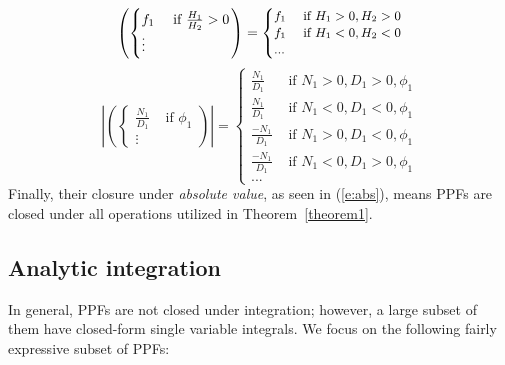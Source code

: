 \documentclass[letterpaper]{article}
\newcommand{\case}[2]{#2 &\text{ if } #1}%
\begin{document}
{\scriptsize
\vspace{3mm}
\begin{equation} 
\label{e:fractional2nlpa}
\left(
 \begin{cases}
  \case{\frac{H_1}{H_2} > 0}{f_1} \\
   \vdots
 \end{cases} 
\right)
 =
{\footnotesize
\begin{cases}
  \case{H_1 > 0, H_2 > 0 }{f_1} \\ 
  \case{H_1 < 0, H_2 < 0}{f_1} \\ 
  ...
 \end{cases} 
}
\end{equation}
\begin{equation}\label{e:abs}
\left|
\left(
  \begin{cases}
  \case{\phi_1}{\frac{N_1}{D_1}}\\
  \vdots
  \end{cases}
\right)
\right|
=
  \begin{cases}
  \case{N_1>0, D_1>0,\phi_1}{\frac{N_1}{D_1}} \\
\case{N_1<0, D_1<0,\phi_1}{\frac{N_1}{D_1}} \\
\case{N_1>0, D_1<0,\phi_1}{\frac{-N_1}{D_1}} \\
\case{N_1<0, D_1>0,\phi_1}{\frac{-N_1}{D_1}} \\
...
 \end{cases}
\end{equation}
}
Finally, their closure under \emph{absolute value}, as seen in  (\ref{e:abs}), 
means PPFs are closed under all operations utilized in Theorem~\ref{theorem1}.

\subsection{Analytic integration}
In general, PPFs are not closed under integration; however, a large subset of them 
 have closed-form single variable integrals.
We focus on the following fairly expressive  subset of PPFs:
\end{document}
